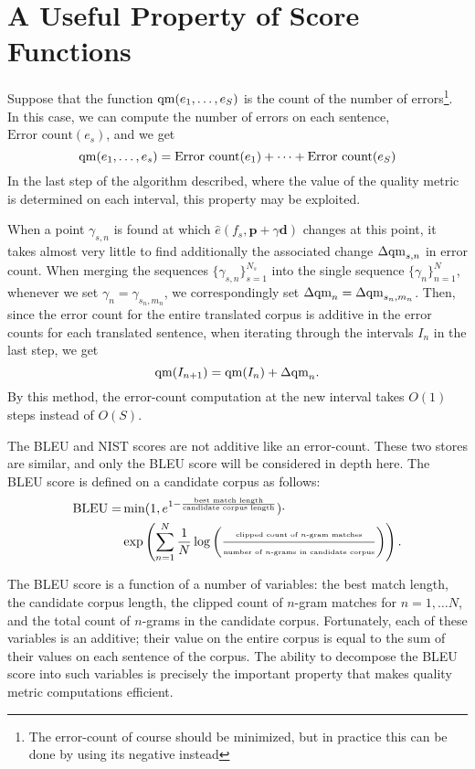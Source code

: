 \documentclass[12pt]{amsart}
\newcommand{\qm}{{\rm qm}}
\begin{document}
\section{A Useful Property of Score Functions\label{sec:scorefunc}}
Suppose that the function $\qm(e_1, \dots , e_S)$ is the count of the number of errors\footnote{The error-count of course should be minimized, but in practice this can be done by using its negative instead}.
In this case, we can compute the number of errors on each sentence, $\text{Error count}(e_s)$, and we get
\[ \qm(e_1, \dots , e_s) = \text{Error count}(e_1) + \cdots + \text{Error count}(e_S) \]
In the last step of the algorithm described, where the value of the quality metric is determined on each interval, this property may be exploited.

When a point $\gamma_{s, n}$ is found at which $\hat{e}(f_s, \boldsymbol{p} + \gamma \boldsymbol{d})$ changes at this point, it takes almost very little to find additionally the associated change $\Delta \qm_{s, n}$ in error count.
When merging the sequences $\{\gamma_{s, n}\}_{s=1}^{N_s}$ into the single sequence $\{\gamma_n\}_{n=1}^N$, whenever we set $\gamma_n = \gamma_{s_n, m_n}$, we correspondingly set $\Delta \qm_n = \Delta \qm_{s_n, m_n}$.
Then, since the error count for the entire translated corpus is additive in the error counts for each translated sentence, when iterating through the intervals $I_n$ in the last step, we get
\[ \qm(I_{n+1}) = \qm(I_n) + \Delta \qm_n. \]
By this method, the error-count computation at the new interval takes $O(1)$ steps instead of $O(S)$.

The BLEU and NIST scores are not additive like an error-count.
These two stores are similar, and only the BLEU score will be considered in depth here.
The BLEU score is defined on a candidate corpus as follows:
\begin{align*}
\text{BLEU} = & \min(1, e^{1-\frac{\text{best match length}}{\text{candidate corpus length}}}) \cdot \\
&\exp \left( \sum_{n=1}^N \frac{1}{N} \log \left( \frac{\text{\tiny{clipped count of $n$-gram matches}}}{\text{\tiny{number of $n$-grams in candidate corpus}}}\right) \right).
\end{align*}

The BLEU score is a function of a number of variables: the best match length, the candidate corpus length, the clipped count of $n$-gram matches for $n=1, \dots N$, and the total count of $n$-grams in the candidate corpus.
Fortunately, each of these variables is an additive; their value on the entire corpus is equal to the sum of their values on each sentence of the corpus.
The ability to decompose the BLEU score into such variables is precisely the important property that makes quality metric computations efficient.
\end{document}
